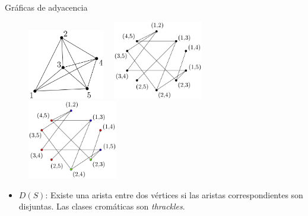 \begin{frame}{Gráficas de adyacencia}
\begin{figure}
	\centering
	\includegraphics[width=0.3\textwidth]{images/K5}%
	~\vrule
	\includegraphics[width=0.35\textwidth]{images/grafica4k5}%
	~\vrule
	\includegraphics[width=0.35\textwidth]{images/grafica4k5_colored}%
\end{figure}

\begin{itemize}
\item $D(S)$: Existe una arista entre dos vértices si las aristas correspondientes son disjuntas. Las clases cromáticas son \emph{thrackles}.
\end{itemize}
\end{frame}

